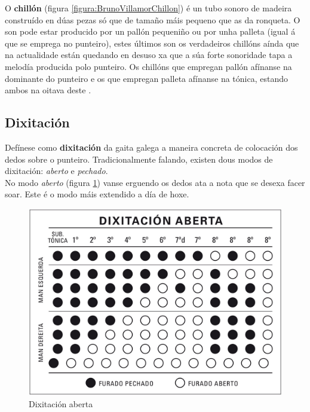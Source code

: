  O \textbf{chillón} (figura \ref{figura:BrunoVillamorChillon}) é un tubo sonoro
 de madeira construído en dúas pezas só que de tamaño máis pequeno que as da
 ronqueta. O son pode estar producido por un pallón pequeniño ou por unha
 palleta (igual á que se emprega no punteiro), estes últimos son os verdadeiros
 chillóns aínda que na actualidade están quedando en desuso xa que a súa forte
 sonoridade tapa a melodía producida polo punteiro. Os chillóns que empregan
 pallón afínanse na dominante do punteiro e os que empregan palleta afínanse na
 tónica, estando ambos na oitava deste \cite{BrunoVillamorCaderno15}.

 \subsection{Dixitación}

 Defínese como \textbf{dixitación} da gaita galega a maneira concreta de
 colocación dos dedos sobre o punteiro. Tradicionalmente falando, existen dous
 modos de dixitación: \textit{aberto} e \textit{pechado}. \\

 No modo \textit{aberto} (figura \ref{figura:PabloCarpinteroDixitacionAberta})
 vanse erguendo os dedos ata a nota que se desexa facer soar. Este é o modo
 máis extendido a día de hoxe. \\

 \begin{figure}[htbp]
  \centering
  \includegraphics[scale=0.2,keepaspectratio=true]{./imagenes/pablo-carpintero-dixitacion-aberta.jpg}
  \caption[Dixitación aberta]{Dixitación aberta \cite{PabloCarpintero}}
  \label{figura:PabloCarpinteroDixitacionAberta}
 \end{figure}

